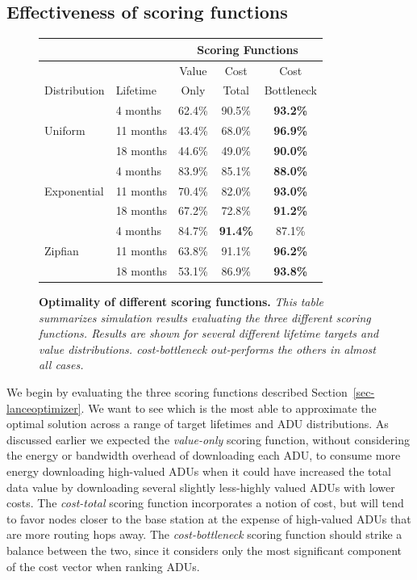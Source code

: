 \documentclass[lettersize]{sig-alternate-konrad}
\begin{document}
\subsection{Effectiveness of scoring functions}
\label{sec-eval-heuristics}

\begin{figure}[t]
\begin{small}
\begin{center}
\begin{tabular}{|l|l|ccc|}
\hline
& & \multicolumn{3}{|c|}{Scoring Functions} \\ \hline
& & Value & Cost & Cost \\
Distribution & Lifetime & Only & Total & Bottleneck \\ \hline
\multirow{3}{*}{Uniform} & 4 months & 62.4\% & 90.5\% & \textbf{93.2\%} \\
& 11 months & 43.4\% & 68.0\% & \textbf{96.9\%} \\
& 18 months & 44.6\% & 49.0\% & \textbf{90.0\%} \\ \hline
\multirow{3}{*}{Exponential} & 4 months & 83.9\% & 85.1\% & \textbf{88.0\%}
\\
& 11 months & 70.4\% & 82.0\% & \textbf{93.0\%} \\
& 18 months & 67.2\% & 72.8\% & \textbf{91.2\%} \\ \hline
\multirow{3}{*}{Zipfian} & 4 months & 84.7\% & \textbf{91.4\%} & 87.1\% \\
& 11 months & 63.8\% & 91.1\% & \textbf{96.2\%} \\
& 18 months & 53.1\% & 86.9\% & \textbf{93.8\%} \\ \hline
\end{tabular}
\end{center}
\end{small}
\caption{\small {\bf Optimality of different scoring functions.} 
{\em This table summarizes simulation results evaluating the three 
different scoring functions.  Results are shown for
several different lifetime targets and value distributions. 
{\em cost-bottleneck} out-performs the others 
in almost all cases.}}
\label{sec-eval-table}
\end{figure}

We begin by evaluating the three scoring functions described
Section~\ref{sec-lanceoptimizer}.  We want to see which is the most able to
approximate the optimal solution across a range of target lifetimes
and ADU distributions. As discussed earlier we expected
the \emph{value-only} scoring function, without considering the energy or
bandwidth overhead of downloading each ADU, to consume more 
energy downloading
high-valued ADUs when it could have increased the total data value by
downloading several slightly less-highly valued ADUs with lower costs.  The
\emph{cost-total} scoring function incorporates a notion of cost, but
will tend to favor nodes closer to the base station at the expense
of high-valued ADUs that are more routing hops away. The
\emph{cost-bottleneck} scoring function should strike a balance between 
the two, since it considers only the most significant component 
of the cost vector when ranking ADUs.
\end{document}
